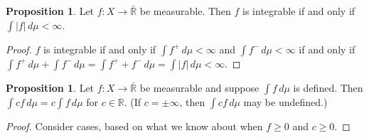 \documentclass{article}
\newcommand{\R}{\mathbb{R}}
\theoremstyle{definition}
\newtheorem{proposition}[theorem]{Proposition}
\begin{document}
\begin{proposition}
Let $f : X \longrightarrow \bar{\R}$ be measurable. Then $f$ is integrable if and only if $\int |f|\,d\mu < \infty$.
\end{proposition}
\begin{proof}
    $f$ is integrable if and only if $\int f^+\,d\mu < \infty$ and $\int f^-\,d\mu < \infty$ if and only if $\int f^+\,d\mu + \int f^-\,d\mu = \int f^+ + f^-\,d\mu = \int |f|\,d\mu < \infty$.
\end{proof}

\begin{proposition}
Let $f : X \longrightarrow \bar{\R}$ be measurable and suppose $\int f\,d\mu$ is defined. Then $\int cf\,d\mu = c\int f\,d\mu$ for $c \in \R$. (If $c = \pm\infty$, then $\int cf\,d\mu$ may be undefined.)
\end{proposition}
\begin{proof}
    Consider cases, based on what we know about when $f \geq 0$ and $c \geq 0$.
\end{proof}
\end{document}
